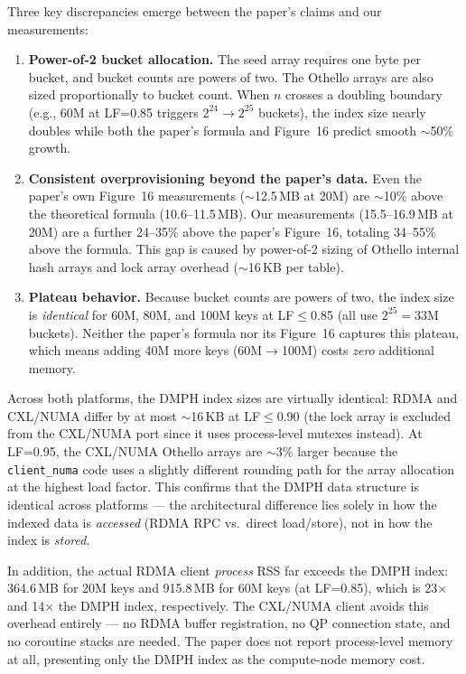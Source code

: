 \documentclass[11pt,a4paper]{article}
\begin{document}
Three key discrepancies emerge between the paper's claims and our measurements:
\begin{enumerate}[nosep]
  \item \textbf{Power-of-2 bucket allocation.} The seed array requires one byte per bucket, and bucket counts are powers of two. The Othello arrays are also sized proportionally to bucket count. When $n$ crosses a doubling boundary (e.g., 60M at LF=0.85 triggers $2^{24} \to 2^{25}$ buckets), the index size nearly doubles while both the paper's formula and Figure~16 predict smooth $\sim$50\% growth.
  \item \textbf{Consistent overprovisioning beyond the paper's data.} Even the paper's own Figure~16 measurements ($\sim$12.5\,MB at 20M) are $\sim$10\% above the theoretical formula (10.6--11.5\,MB). Our measurements (15.5--16.9\,MB at 20M) are a further 24--35\% above the paper's Figure~16, totaling 34--55\% above the formula. This gap is caused by power-of-2 sizing of Othello internal hash arrays and lock array overhead ($\sim$16\,KB per table).
  \item \textbf{Plateau behavior.} Because bucket counts are powers of two, the index size is \emph{identical} for 60M, 80M, and 100M keys at LF$\leq$0.85 (all use $2^{25}=33$M buckets). Neither the paper's formula nor its Figure~16 captures this plateau, which means adding 40M more keys (60M$\to$100M) costs \emph{zero} additional memory.
\end{enumerate}

Across both platforms, the DMPH index sizes are virtually identical: RDMA and CXL/NUMA differ by at most $\sim$16\,KB at LF$\leq$0.90 (the lock array is excluded from the CXL/NUMA port since it uses process-level mutexes instead). At LF=0.95, the CXL/NUMA Othello arrays are $\sim$3\% larger because the \texttt{client\_numa} code uses a slightly different rounding path for the array allocation at the highest load factor. This confirms that the DMPH data structure is identical across platforms --- the architectural difference lies solely in how the indexed data is \emph{accessed} (RDMA RPC vs.\ direct load/store), not in how the index is \emph{stored}.

In addition, the actual RDMA client \emph{process} RSS far exceeds the DMPH index: 364.6\,MB for 20M keys and 915.8\,MB for 60M keys (at LF=0.85), which is 23$\times$ and 14$\times$ the DMPH index, respectively. The CXL/NUMA client avoids this overhead entirely --- no RDMA buffer registration, no QP connection state, and no coroutine stacks are needed. The paper does not report process-level memory at all, presenting only the DMPH index as the compute-node memory cost.
\end{document}
